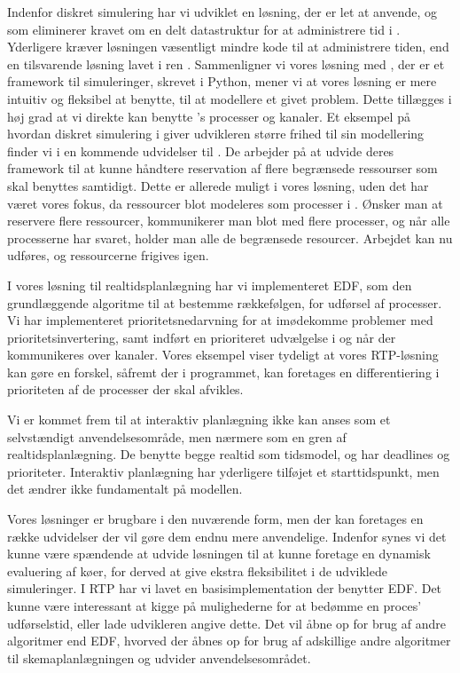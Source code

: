 Indenfor diskret simulering har vi udviklet en løsning, der er let at anvende, og som eliminerer kravet om en delt datastruktur for at administrere tid i \pycsp. Yderligere kræver løsningen væsentligt mindre kode til at administrere tiden, end en tilsvarende løsning lavet i ren \pycsp. 
Sammenligner vi vores løsning med \simpy, der er et framework til simuleringer, skrevet i Python, mener vi at vores løsning er mere intuitiv og fleksibel at benytte, til at modellere et givet problem. Dette tillægges i høj grad at vi direkte kan benytte \pycsp's processer og kanaler. Et eksempel på hvordan diskret simulering i \pycsp giver udvikleren større frihed til sin modellering finder vi i en kommende udvidelser til \simpy. De arbejder  på at udvide deres framework til at kunne håndtere reservation af flere begrænsede ressourser som skal benyttes samtidigt. Dette er allerede muligt i vores løsning, uden det har været vores fokus, da ressourcer blot modeleres som processer i \pycsp. Ønsker man at reservere flere ressourcer, kommunikerer man blot med flere processer, og når alle processerne har svaret, holder man alle de begrænsede resourcer. Arbejdet kan nu udføres, og ressourcerne frigives igen. 

I vores løsning til realtidsplanlægning har vi implementeret EDF, som den grundlæggende algoritme til at bestemme rækkefølgen, for udførsel af processer. Vi har implementeret prioritetsnedarvning for at imødekomme problemer med prioritetsinvertering, samt indført en prioriteret udvælgelse i  og når der kommunikeres over kanaler. Vores eksempel viser tydeligt at vores RTP-løsning kan gøre en forskel, såfremt der i programmet, kan foretages en differentiering i prioriteten af de processer der skal afvikles. 

Vi er kommet frem til at interaktiv planlægning ikke kan anses som et selvstændigt anvendelsesområde, men nærmere som en gren af realtidsplanlægning. De benytte begge realtid som tidsmodel, og har deadlines og prioriteter. Interaktiv planlægning har yderligere tilføjet et starttidspunkt, men det ændrer ikke fundamentalt på modellen. 

Vores løsninger er brugbare i den nuværende form, men der kan foretages en række udvidelser der vil gøre dem endnu mere anvendelige. 
Indenfor \des synes vi det kunne være spændende at udvide løsningen til at kunne foretage en dynamisk evaluering af køer, for derved at give ekstra fleksibilitet i de udviklede simuleringer. I RTP har vi lavet en basisimplementation der benytter EDF. Det kunne være interessant at kigge på mulighederne for at bedømme en proces' udførselstid, eller lade udvikleren angive dette. Det vil åbne op for brug af andre algoritmer end EDF, hvorved der åbnes op for brug af adskillige andre algoritmer til skemaplanlægningen og udvider anvendelsesområdet.  







